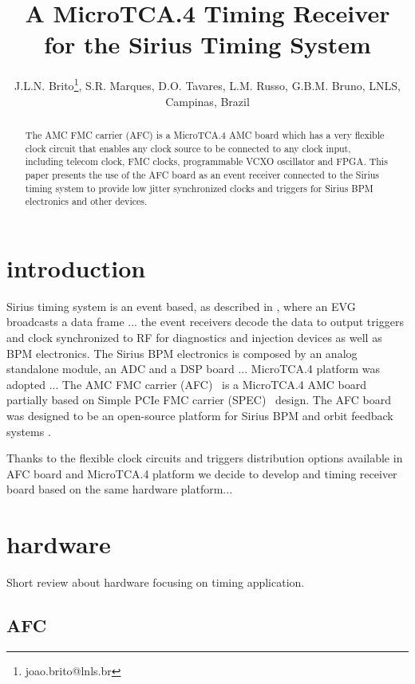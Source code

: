 \documentclass[a4paper,
               biblatex,      %
               ]{jacow}
\begin{document}
\title{A MicroTCA.4  Timing Receiver for the Sirius Timing System}

\author{J.L.N. Brito\thanks{joao.brito@lnls.br}, S.R. Marques, D.O. Tavares, L.M. Russo, G.B.M. Bruno, LNLS, Campinas, Brazil}
	
\maketitle

%
\begin{abstract}
   The AMC FMC carrier (AFC) is a MicroTCA.4 AMC board which has a very flexible clock circuit that enables any clock source to be connected to any clock input, including telecom clock, FMC clocks, programmable VCXO oscillator and FPGA. This paper presents the use of the AFC board as an event receiver connected to the Sirius timing system to provide low jitter synchronized clocks and triggers for Sirius BPM electronics and other devices.
\end{abstract}


\section{introduction}
Sirius timing system is an event based, as described in \cite{timing_icalepcs15}, where an EVG broadcasts a data frame ... the event receivers decode the data to output triggers and clock synchronized to RF for diagnostics and injection devices as well as BPM electronics.   
The Sirius BPM electronics is composed by an analog standalone module, an ADC and a DSP board ... MicroTCA.4 platform was adopted ... The AMC FMC carrier (AFC)~\cite{afc-git} is a MicroTCA.4 AMC board partially based on Simple PCIe FMC carrier (SPEC)~ \cite{spec} design. 
The AFC board was designed to be an open-source platform for Sirius BPM and orbit feedback systems \cite{ebpm_icalepcs13}.

Thanks to the flexible clock circuits and triggers distribution options available in AFC board and MicroTCA.4 platform we decide to develop and timing receiver board based on the same hardware platform... 

\section{hardware}
Short review about hardware focusing on timing application.

\subsection{AFC}
\end{document}
